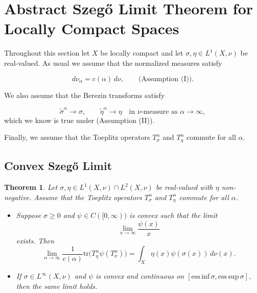 \documentclass{amsart}
\newtheorem{thm}{Theorem}[section]
\theoremstyle{definition}
\theoremstyle{remark}
\numberwithin{equation}{section}
\newcommand{\tr}{\text{tr}} %
\newcommand{\calF}{\mathcal{F}}
\begin{document}
\section{Abstract Szeg\H{o} Limit Theorem for Locally Compact Spaces}

Throughout this section let $X$ be locally compact and let
$\sigma,\eta \in L^1(X,\nu)$ be real-valued.
As usual we assume that the normalized measures satisfy

\[
d\nu_\alpha = c(\alpha)\, d\nu,
\qquad\text{(Assumption (I))}.
\]

We also assume that the Berezin transforms satisfy

\[
\widetilde{\sigma}^{\alpha} \to \sigma,
\qquad
\widetilde{\eta}^{\alpha} \to \eta
\quad\text{in $\nu$-measure as } \alpha\to\infty,
\]
which we know is true under (Assumption (II)). 

Finally, we assume that the Toeplitz operators $T_\sigma^\alpha$ and $T_\eta^\alpha$ commute for all $\alpha$.

\subsection{Convex Szeg\H{o} Limit}

\begin{thm}\label{thm:convex_szego_lc} Let $\sigma,\eta\in L^1(X,\nu)\cap L^2(X,\nu)$ be real-valued with $\eta$ non-negative.
Assume that the Toeplitz operators $T_\sigma^\alpha$ and
$T_\eta^\alpha$ commute for all $\alpha$. 
\leavevmode
\begin{itemize}
\item[(i)] Suppose $\sigma \ge 0$ and $\psi \in C([0,\infty))$
is convex such that the limit
\[
\lim_{x\to\infty} \frac{\psi(x)}{x}
\]
exists. Then
\[
\lim_{\alpha\to\infty}
\frac{1}{c(\alpha)}
\tr\!\big(T_\eta^\alpha \psi(T_\sigma^\alpha)\big)
=
\int_X \eta(x)\psi(\sigma(x))\,d\nu(x).
\]

\item[(ii)] If $\sigma \in L^\infty(X,\nu)$ and
$\psi$ is convex and continuous on
$[\mathrm{ess\,inf}\,\sigma,\mathrm{ess\,sup}\,\sigma]$,
then the same limit holds.
\end{itemize}
\end{thm}
\end{document}
